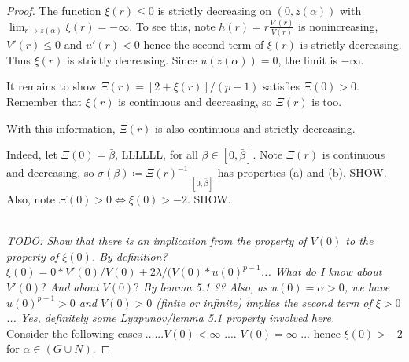\begin{lemma}
\begin{proof}
The function $\xi(r)\leq0$ is strictly decreasing on $(0,z(\alpha))$
with $\lim_{r\to z(\alpha)}\xi(r)=-\infty$. {\color{red}
To see this, note $h(r)=r\frac{V'(r)}{V(r)}$ is nonincreasing,
$V'(r)\leq0$ and $u'(r)<0$ hence the second term of $\xi(r)$ is strictly decreasing.
Thus $\xi(r)$ is strictly decreasing.
Since $u(z(\alpha))=0$, the limit is $-\infty$.}

It remains to show $\Xi(r)=\left[2+\xi(r)\right]/(p-1)$ satisfies $\Xi(0)>0$.
Remember that $\xi(r)$ is continuous and decreasing, so $\Xi(r)$ is too. \\

\seperate

With this information, $\Xi(r)$ is also continuous and strictly decreasing.

Indeed, let $\Xi(0)=\bar\beta$, LLLLLL, for all $\beta\in[0,\bar\beta]$.
Note $\Xi(r)$ is continuous and decreasing, so
$\sigma(\beta)\coloneqq\left.\Xi(r)^{-1}\right|_{[0,\bar\beta]}$
has properties (a) and (b). SHOW. \\

Also, note $\Xi(0)>0\iff\xi(0)>-2$. SHOW.\\

\seperate

\emph{}\\[11pt]\emph{TODO: Show that there is an implication from the property of $V(0)$ to the property of $\xi(0)$. By definition? $\xi(0) = 0 * V'(0)/V(0) + 2\lambda / (V(0)*u(0)^{p-1}$... What do I know about $V'(0)?$ And about $V(0)?$ By lemma 5.1 ?? Also, as $u(0)=\alpha>0$, we have $u(0)^{p-1}>0$ and $V(0)>0$ (finite or infinite) implies the second term of $\xi > 0$... Yes, definitely some Lyapunov/lemma 5.1 property involved here.}\\[11pt]
Consider the following cases ......$V(0)<\infty$ .... $V(0)=\infty$ ... hence $\xi(0)>-2$ for $\alpha\in(G\cup N)$.

\end{proof}
\end{lemma}

